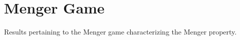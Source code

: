 
\chapter{Menger Game}

Results pertaining to the Menger game characterizing the Menger property.











